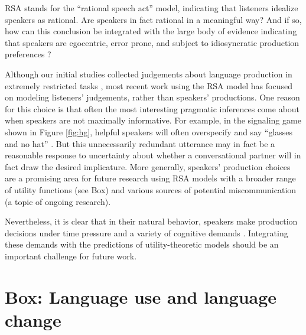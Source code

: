 \documentclass[]{elsarticle}
\begin{document}
RSA stands for the ``rational speech act'' model, indicating that listeners idealize speakers as rational.
Are speakers in fact rational in a meaningful way? And if so, how can this conclusion be
integrated with the large body of evidence indicating that speakers are
egocentric, error prone, and subject to idiosyncratic production
preferences \citep{keysar2003,lane2006,gatt2013}?

Although our initial studies collected judgements about language
production in extremely restricted tasks \citep{frank2012}, most
recent work using the RSA model has focused on modeling listeners'
judgements, rather than speakers' productions. One reason for this
choice is that often the most interesting pragmatic inferences come
about when speakers are not maximally informative. For example, in the
signaling game shown in Figure \ref{fig:hg}, helpful speakers will often
overspecify and say ``glasses and no hat'' \citep{baumann2014}. 
But this unnecessarily redundant utterance may in fact be a
reasonable response to uncertainty about whether a conversational
partner will in fact draw the desired implicature.
%
More generally, speakers' production choices are a promising area for
future research using RSA models with a broader range of utility
functions (see Box) and various sources of potential miscommunication (a topic of ongoing research).


Nevertheless, it is clear that in their natural behavior, speakers make
production decisions under time pressure and a variety of cognitive
demands \citep{levelt1993}. Integrating these demands with the predictions of
utility-theoretic models should be an important challenge for future
work.

\section{Box: Language use and language
change}\label{box-language-use-and-language-change}
\end{document}
